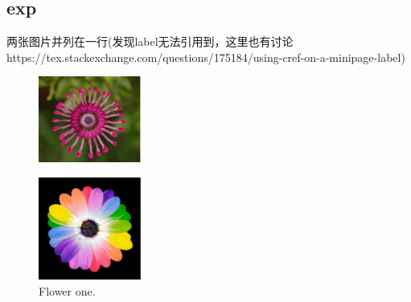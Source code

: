 \documentclass{article}
\begin{document}
\begin{CJK}{UTF8}{gbsn}
	

	
\section{exp}

两张图片并列在一行(发现label无法引用到，这里也有讨论https://tex.stackexchange.com/questions/175184/using-cref-on-a-minipage-label)
\begin{figure}[!tbp]
	\centering
	\begin{minipage}[b]{0.4\textwidth}
		\includegraphics[width=\textwidth]{imgs/flower1.png}
		\label{fig:label1}
		\caption{Flower one.}
	\end{minipage}
	\hfill     %
	\begin{minipage}[b]{0.4\textwidth}
		\includegraphics[width=\textwidth]{imgs/flower2.png}

\end{minipage}
\end{figure}
\end{CJK}
\end{document}
